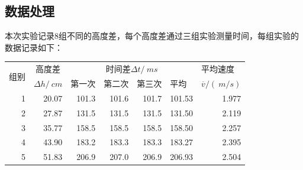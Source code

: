 \documentclass[12pt]{article}
\begin{document}
\subsection*{数据处理}
本次实验记录8组不同的高度差，每个高度差通过三组实验测量时间，每组实验的数据记录如下：
\begin{table}[htbp]
    \centering
    \begin{tabular}{|r|r|r|r|r|r|r|}
        \hline
        \multicolumn{1}{|c|}{\multirow{2}[4]{*}{ 组别}} & \multicolumn{1}{c|}{高度差 } & \multicolumn{4}{c|}{时间差$\Delta t /\SI{}{ms}$} & \multicolumn{1}{l|}{平均速度} \bigstrut                                                                                              \\
        \cline{3-6}                                   & $\Delta h/\SI{}{cm}$      & \multicolumn{1}{l|}{第一次}                      & \multicolumn{1}{l|}{第二次}            & \multicolumn{1}{l|}{第三次} & \multicolumn{1}{l|}{平均} & $\overline{v}/(\SI{}{m/s})$ \bigstrut \\
        \hline
        1                                             & 20.07                     & 101.3                                         & 101.6                               & 101.7                    & 101.53                  & 1.977 \bigstrut                       \\
        \hline
        2                                             & 27.87                     & 131.5                                         & 131.5                               & 131.5                    & 131.50                  & 2.119 \bigstrut                       \\
        \hline
        3                                             & 35.77                     & 158.5                                         & 158.5                               & 158.5                    & 158.50                  & 2.257 \bigstrut                       \\
        \hline
        4                                             & 43.90                     & 183.2                                         & 183.3                               & 183.3                    & 183.27                  & 2.395 \bigstrut                       \\
        \hline
        5                                             & 51.83                     & 206.9                                         & 207.0                               & 206.9                    & 206.93                  & 2.504 \bigstrut                       \\

\end{tabular}
\end{table}
\end{document}
